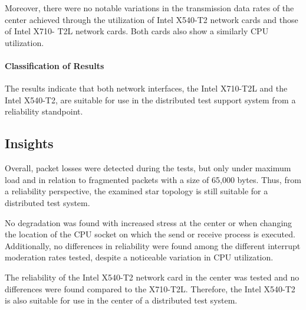 Moreover, there were no notable variations in the transmission data rates of the center achieved through the utilization of Intel X540-T2 network cards and those of Intel X710- T2L network cards. Both cards also show a similarly CPU utilization.

\paragraph{Classification of Results}
The results indicate that both network interfaces, the Intel X710-T2L and the Intel X540-T2, are suitable for use in the distributed test support system from a reliability standpoint. 

\subsection{Insights}
Overall, packet losses were detected during the tests, but only under maximum load and in relation to fragmented packets with a size of 65,000 bytes. Thus, from a reliability perspective, the examined star topology is still suitable for a distributed test system.

No degradation was found with increased stress at the center or when changing the location of the CPU socket on which the send or receive process is executed. Additionally, no differences in reliability were found among the different interrupt moderation rates tested, despite a noticeable variation in CPU utilization.

The reliability of the Intel X540-T2 network card in the center was tested and no differences were found compared to the X710-T2L. Therefore, the Intel X540-T2 is also suitable for use in the center of a distributed test system.








